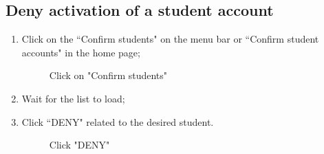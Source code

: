 \documentclass[ManualeUtente]{subfiles}
\begin{document}
\subsection{Deny activation of a student account}
\begin{enumerate}
	\item Click on the \textquotedblleft Confirm students" on the menu bar or \textquotedblleft Confirm student accounts" in the home page;
	\begin{figure}[H]
		\centering
		\caption{Click on "Confirm students"}
		\label{fig:Click on "Confirm students"}
	\end{figure}
	\item Wait for the list to load;
	\item Click \textquotedblleft DENY" related to the desired student.
	\begin{figure}[H]
		\centering
		\caption{Click "DENY"}
		\label{fig:Click "DENY"}
	\end{figure}
\end{enumerate}
\end{document}
